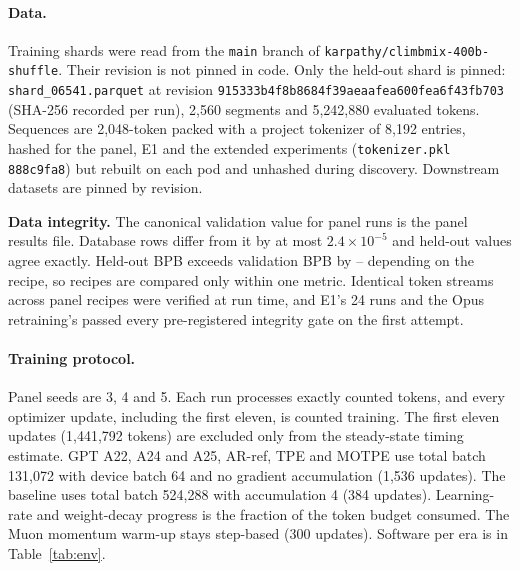 \documentclass{article}
\newif\ifshowhumanmarkers \showhumanmarkersfalse
\newcommand{\humantag}[1]{{\color{humanframe}\sffamily\scriptsize\bfseries HUMAN AUTHOR MUST REWRITE/VERIFY [#1]}\ }
\newcommand{\humanauthor}[2][]{\ifshowhumanmarkers\begin{humanbox}\humantag{#1}#2\end{humanbox}\else #2\par\fi}
\begin{document}
\paragraph{Data.} Training shards were read from the \texttt{main} branch of \texttt{karpathy/climbmix-400b-shuffle}. Their revision is not pinned in code. Only the held-out shard is pinned: \texttt{shard\_06541.parquet} at revision \texttt{915333b4f8b8684f39aeaafea600fea6f43fb703} (SHA-256 recorded per run), 2,560 segments and 5,242,880 evaluated tokens. Sequences are 2,048-token packed with a project tokenizer of 8,192 entries, hashed for the panel, E1 and the extended experiments (\texttt{tokenizer.pkl} \texttt{888c9fa8}) but rebuilt on each pod and unhashed during discovery. Downstream datasets are pinned by revision.

\humanauthor[P2-11]{\textbf{Data integrity.} The canonical validation value for panel runs is the panel results file. Database rows differ from it by at most $2.4\times10^{-5}$ and held-out values agree exactly. Held-out BPB exceeds validation BPB by \CRHeldValOffLo--\CRHeldValOffHi{} depending on the recipe, so recipes are compared only within one metric. Identical token streams across panel recipes were verified at run time, and E1's 24 runs and the Opus retraining's \CRMTRuns{} passed every pre-registered integrity gate on the first attempt.}

\paragraph{Training protocol.} Panel seeds are 3, 4 and 5. Each run processes exactly \CRPanelBudget{} counted tokens, and every optimizer update, including the first eleven, is counted training. The first eleven updates (1,441,792 tokens) are excluded only from the steady-state timing estimate. GPT A22, A24 and A25, AR-ref, TPE and MOTPE use total batch 131,072 with device batch 64 and no gradient accumulation (1,536 updates). The baseline uses total batch 524,288 with accumulation 4 (384 updates). Learning-rate and weight-decay progress is the fraction of the token budget consumed. The Muon \citep{jordan2024muon} momentum warm-up stays step-based (300 updates). Software per era is in Table~\ref{tab:env}.
\end{document}
